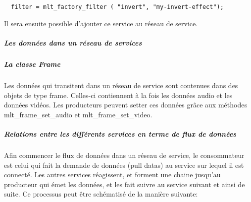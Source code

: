 \subparagraph{}

\begin{lstlisting}
  filter = mlt_factory_filter ( "invert", "my-invert-effect");
\end{lstlisting}

Il sera ensuite possible d'ajouter ce service au réseau de service.

\subparagraph{Les données dans un réseau de services}

\subparagraph{La classe Frame} Les données qui transitent dans un
réseau de service sont contenues dans des objets de type frame. Celles-ci
contiennent à la fois les données audio et les données vidéos. Les
producteurs peuvent setter ces données grâce aux méthodes
mlt\_frame\_set\_audio et mlt\_frame\_set\_video.

\subparagraph{Relations entre les différents services en terme de flux
de données}

Afin commencer le flux de données dans un réseau de service, le
consommateur est celui qui fait la demande de données (pull datas) au
service sur lequel il est connecté. Les autres services réagissent,
et forment une chaine jusqu'au producteur qui émet les données, et
les fait suivre au service suivant et ainsi de suite. Ce processus peut
être schématisé de la manière suivante:

